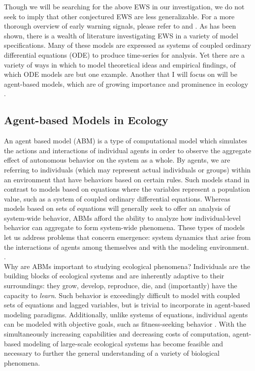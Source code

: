 \documentclass[12pt]{article}
\begin{document}
Though we will be searching for the above EWS in our investigation, we do not seek to imply that other conjectured EWS are less generalizable. For a more thorough overview of early warning signals, please refer to \cite{Dakos2012} and \cite{Lade2012}. As has been shown, there is a wealth of literature investigating EWS in a variety of model specifications. Many of these models are expressed as systems of coupled ordinary differential equations (ODE) to produce time-series for analysis. Yet there are a variety of ways in which to model theoretical ideas and empirical findings, of which ODE models are but one example. Another that I will focus on will be agent-based models, which are of growing importance and prominence in ecology \cite{Grimm2005}\cite{Parunak1998}. 

\subsection{Agent-based Models in Ecology}
An agent based model (ABM) is a type of computational model which simulates the actions and interactions of individual agents in order to observe the aggregate effect of autonomous behavior on the system as a whole. By agents, we are referring to individuals (which may represent actual individuals or groups) within an environment that have behaviors based on certain rules. Such models stand in contrast to models  based on equations where the variables represent a population value, such as a system of coupled ordinary differential equations.  Whereas models based on sets of equations will generally seek to offer an analysis of system-wide behavior, ABMs afford the ability to analyze how individual-level behavior can aggregate to form system-wide phenomena. These types of models let us address problems that concern emergence: system dynamics that arise from the interactions of agents among themselves and with the modeling environment. \cite{Grimm2012}. \\

Why are ABMs important to studying ecological phenomena? Individuals are the building blocks of ecological systems and are inherently adaptive to their surroundings: they grow, develop, reproduce, die, and (importantly) have the capacity to \emph{learn}. Such behavior is exceedingly difficult to model with coupled sets of equations and lagged variables, but  is trivial to incorporate in agent-based modeling paradigms. Additionally, unlike systems of equations, individual agents can be modeled with objective goals, such as fitness-seeking behavior \cite{Volker2005}. With the simultaneously increasing capabilities and decreasing costs of computation, agent-based modeling of large-scale ecological systems has become feasible and necessary to further the general understanding of a variety of biological phenomena.\\
\end{document}
